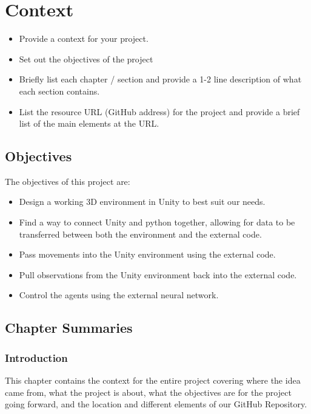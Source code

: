 
\chapter{Context}
\begin{itemize}
\item Provide a context for your project.
\item Set out the objectives of the project
\item Briefly list each chapter / section and provide a 1-2 line description of what each section contains.
\item List the resource URL (GitHub address) for the project and provide a brief list of the main elements at the URL.
\end{itemize}

\section{Objectives}
The objectives of this project are:

\begin{itemize}
    \item{Design a working 3D environment in Unity to best suit our needs.}
    \item{Find a way to connect Unity and python together, allowing for data to be transferred between both the environment and the external code.}
    \item{Pass movements into the Unity environment using the external code.}
    \item{Pull observations from the Unity environment back into the external code.}
    \item{Control the agents using the external neural network.}
\end{itemize}

\section{Chapter Summaries}

\subsection{Introduction}
This chapter contains the context for the entire project covering where the idea came from, what the project is about, what the objectives are for the project going forward, and the location and different elements of our GitHub Repository.


